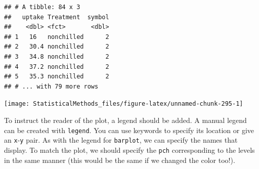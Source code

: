 \documentclass[
]{book}
\newenvironment{Shaded}{\begin{snugshade}}{\end{snugshade}}
\newcommand{\DataTypeTok}[1]{\textcolor[rgb]{0.13,0.29,0.53}{#1}}
\newcommand{\DecValTok}[1]{\textcolor[rgb]{0.00,0.00,0.81}{#1}}
\newcommand{\KeywordTok}[1]{\textcolor[rgb]{0.13,0.29,0.53}{\textbf{#1}}}
\newcommand{\NormalTok}[1]{#1}
\newcommand{\OperatorTok}[1]{\textcolor[rgb]{0.81,0.36,0.00}{\textbf{#1}}}
\newcommand{\StringTok}[1]{\textcolor[rgb]{0.31,0.60,0.02}{#1}}
\theoremstyle{definition}
\theoremstyle{definition}
\theoremstyle{definition}
\theoremstyle{remark}
\begin{document}
\begin{Shaded}
\end{Shaded}

\begin{verbatim}
## # A tibble: 84 x 3
##   uptake Treatment  symbol
##    <dbl> <fct>       <dbl>
## 1   16   nonchilled      2
## 2   30.4 nonchilled      2
## 3   34.8 nonchilled      2
## 4   37.2 nonchilled      2
## 5   35.3 nonchilled      2
## # ... with 79 more rows
\end{verbatim}

\begin{Shaded}
\end{Shaded}

\begin{center}\texttt{[image: StatisticalMethods\_files/figure-latex/unnamed-chunk-295-1]} \end{center}

To instruct the reader of the plot, a legend should be added. A manual legend can be created with \texttt{legend}. You can use keywords to specify its location or give an \texttt{x}-\texttt{y} pair. As with the legend for \texttt{barplot}, we can specify the names that display. To match the plot, we should specify the \texttt{pch} corresponding to the levels in the same manner (this would be the same if we changed the color too!).

\begin{Shaded}
\end{Shaded}
\end{document}
